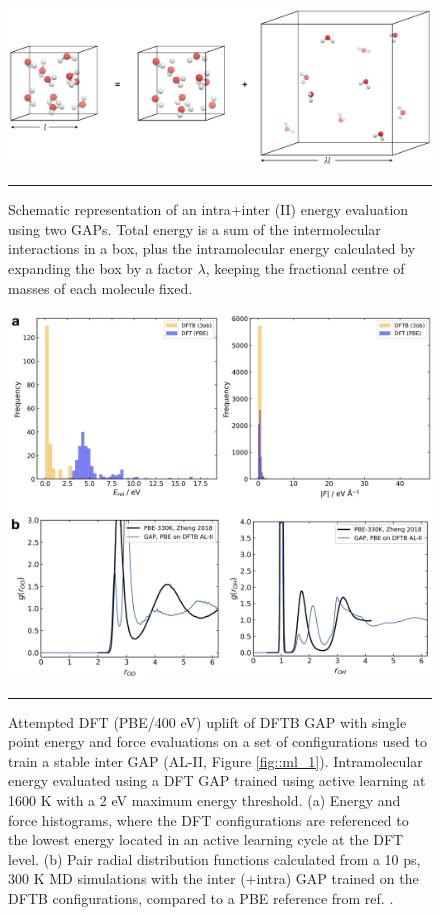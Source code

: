 \documentclass[../../main.tex]{subfiles}
\begin{document}
\begin{figure}[h!]
	\vspace{0.4cm}
	\centering
	\includegraphics[width=\textwidth]{6/gap/figs_si/fig10}
	\vspace{0.2cm}
	\hrule
	\caption{Schematic representation of an intra+inter (II) energy evaluation using two GAPs. Total energy is a sum of the intermolecular interactions in a box, plus the intramolecular energy calculated by expanding the box by a factor $\lambda$, keeping the fractional centre of masses of each molecule fixed.}
	\label{fig::ml_si_10}
\end{figure}



\begin{figure}[h!]
	\vspace{0.4cm}
	\centering
	\includegraphics[width=\textwidth]{6/gap/figs_si/fig11}
	\vspace{0.2cm}
	\hrule
	\caption{Attempted DFT (PBE/400 eV) uplift of DFTB GAP with single point energy and force evaluations on a set of configurations used to train a stable inter GAP (AL-II, Figure \ref{fig::ml_1}). Intramolecular energy evaluated using a DFT GAP trained using active learning at 1600 K with a 2 eV maximum energy threshold. (a) Energy and force histograms, where the DFT configurations are referenced to the lowest energy located in an active learning cycle at the DFT level. (b) Pair radial distribution functions calculated from a 10 ps, 300 K MD simulations with the inter (+intra) GAP trained on the DFTB configurations, compared to a PBE reference from ref. \cite{Zheng2018}.}
	\label{fig::ml_si_11}
\end{figure}
\end{document}
